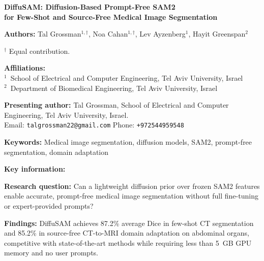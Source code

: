 \documentclass[11pt,a4paper]{article}
\begin{document}
\begin{center}
{\Large\bfseries DiffuSAM: Diffusion-Based Prompt-Free SAM2\\[2pt]
for Few-Shot and Source-Free Medical Image Segmentation}
\end{center}

\bigskip

\textbf{Authors:}
Tal Grossman$^{1,\dagger}$, Noa Cahan$^{1,\dagger}$, Lev Ayzenberg$^{1}$, Hayit Greenspan$^{2}$

{\small $^\dagger$ Equal contribution.}

\textbf{Affiliations:}\\
$^{1}$~School of Electrical and Computer Engineering, Tel Aviv University, Israel\\
$^{2}$~Department of Biomedical Engineering, Tel Aviv University, Israel

\textbf{Presenting author:}
Tal Grossman, School of Electrical and Computer Engineering, Tel Aviv University, Israel.\\
Email: \texttt{talgrossman22@gmail.com} \quad Phone: \texttt{+972544959548}

\bigskip

\textbf{Keywords:}
Medical image segmentation, diffusion models, SAM2, prompt-free segmentation, domain adaptation

\bigskip

\textbf{Key information:}

\textbf{Research question:}
Can a lightweight diffusion prior over frozen SAM2 features enable accurate, prompt-free medical image segmentation without full fine-tuning or expert-provided prompts?

\textbf{Findings:}
DiffuSAM achieves 87.2\% average Dice in few-shot CT segmentation and 85.2\% in source-free CT-to-MRI domain adaptation on abdominal organs, competitive with state-of-the-art methods while requiring less than 5~GB GPU memory and no user prompts.
\end{document}
